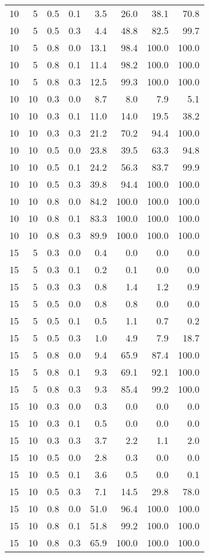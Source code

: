 \documentclass[
  english,
  man]{apa6}
\begin{document}
\begin{appendix}
\begin{longtable}[t]{rrrrrrrr}
10 & 5 & 0.5 & 0.1 & 3.5 & 26.0 & 38.1 & 70.8\\
10 & 5 & 0.5 & 0.3 & 4.4 & 48.8 & 82.5 & 99.7\\
10 & 5 & 0.8 & 0.0 & 13.1 & 98.4 & 100.0 & 100.0\\
10 & 5 & 0.8 & 0.1 & 11.4 & 98.2 & 100.0 & 100.0\\
10 & 5 & 0.8 & 0.3 & 12.5 & 99.3 & 100.0 & 100.0\\
10 & 10 & 0.3 & 0.0 & 8.7 & 8.0 & 7.9 & 5.1\\
10 & 10 & 0.3 & 0.1 & 11.0 & 14.0 & 19.5 & 38.2\\
10 & 10 & 0.3 & 0.3 & 21.2 & 70.2 & 94.4 & 100.0\\
10 & 10 & 0.5 & 0.0 & 23.8 & 39.5 & 63.3 & 94.8\\
10 & 10 & 0.5 & 0.1 & 24.2 & 56.3 & 83.7 & 99.9\\
10 & 10 & 0.5 & 0.3 & 39.8 & 94.4 & 100.0 & 100.0\\
10 & 10 & 0.8 & 0.0 & 84.2 & 100.0 & 100.0 & 100.0\\
10 & 10 & 0.8 & 0.1 & 83.3 & 100.0 & 100.0 & 100.0\\
10 & 10 & 0.8 & 0.3 & 89.9 & 100.0 & 100.0 & 100.0\\
15 & 5 & 0.3 & 0.0 & 0.4 & 0.0 & 0.0 & 0.0\\
15 & 5 & 0.3 & 0.1 & 0.2 & 0.1 & 0.0 & 0.0\\
15 & 5 & 0.3 & 0.3 & 0.8 & 1.4 & 1.2 & 0.9\\
15 & 5 & 0.5 & 0.0 & 0.8 & 0.8 & 0.0 & 0.0\\
15 & 5 & 0.5 & 0.1 & 0.5 & 1.1 & 0.7 & 0.2\\
15 & 5 & 0.5 & 0.3 & 1.0 & 4.9 & 7.9 & 18.7\\
15 & 5 & 0.8 & 0.0 & 9.4 & 65.9 & 87.4 & 100.0\\
15 & 5 & 0.8 & 0.1 & 9.3 & 69.1 & 92.1 & 100.0\\
15 & 5 & 0.8 & 0.3 & 9.3 & 85.4 & 99.2 & 100.0\\
15 & 10 & 0.3 & 0.0 & 0.3 & 0.0 & 0.0 & 0.0\\
15 & 10 & 0.3 & 0.1 & 0.5 & 0.0 & 0.0 & 0.0\\
15 & 10 & 0.3 & 0.3 & 3.7 & 2.2 & 1.1 & 2.0\\
15 & 10 & 0.5 & 0.0 & 2.8 & 0.3 & 0.0 & 0.0\\
15 & 10 & 0.5 & 0.1 & 3.6 & 0.5 & 0.0 & 0.1\\
15 & 10 & 0.5 & 0.3 & 7.1 & 14.5 & 29.8 & 78.0\\
15 & 10 & 0.8 & 0.0 & 51.0 & 96.4 & 100.0 & 100.0\\
15 & 10 & 0.8 & 0.1 & 51.8 & 99.2 & 100.0 & 100.0\\
15 & 10 & 0.8 & 0.3 & 65.9 & 100.0 & 100.0 & 100.0\\
\bottomrule
\end{longtable}







\end{appendix}
\end{document}
